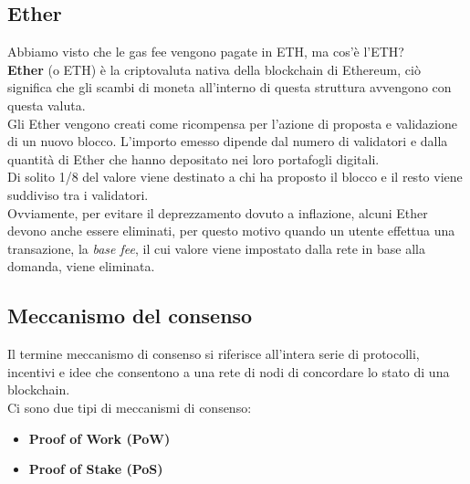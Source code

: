 \subsection{Ether}
Abbiamo visto che le gas fee vengono pagate in ETH, ma cos'è l'ETH? \\
\textbf{Ether} (o ETH) è la criptovaluta nativa della blockchain di Ethereum, ciò
significa che gli scambi di moneta all'interno di questa struttura avvengono
con questa valuta. \\
Gli Ether vengono creati come ricompensa per l'azione di proposta e validazione
di un nuovo blocco. L'importo emesso dipende dal numero di validatori e dalla
quantità di Ether che hanno depositato nei loro portafogli digitali. \\
Di solito 1/8 del valore viene destinato a chi ha proposto il blocco e il resto
viene suddiviso tra i validatori. \\
Ovviamente, per evitare il deprezzamento dovuto a inflazione, alcuni Ether 
devono anche essere eliminati, per questo motivo quando un utente effettua
una transazione, la \textit{base fee}, il cui valore viene impostato dalla
rete in base alla domanda, viene eliminata.

\subsection{Meccanismo del consenso}
Il termine meccanismo di consenso si riferisce all'intera serie di protocolli,
incentivi e idee che consentono a una rete di nodi di concordare lo stato di
una blockchain. \\
Ci sono due tipi di meccanismi di consenso: 
\begin{itemize}
    \item \textbf{Proof of Work (PoW)}
    \item \textbf{Proof of Stake (PoS)}
\end{itemize}

